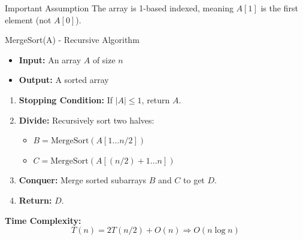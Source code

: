 \begin{frame}

\begin{alertblock}{Important Assumption}
        The array is 1-based indexed, meaning \( A[1] \) is the first element (not \( A[0] \)).
    \end{alertblock}
\begin{block}{MergeSort(A) - Recursive Algorithm}
        \begin{itemize}
            \item \textbf{Input:} An array \( A \) of size \( n \)
            \item \textbf{Output:} A sorted array
        \end{itemize}
        
        \begin{enumerate}
            \item \textbf{Stopping Condition:} If \( |A| \leq 1 \), return \( A \).
            \item \textbf{Divide:} Recursively sort two halves:
            \begin{itemize}
                \item \( B = \text{MergeSort}(A[1 \dots n/2]) \)
                \item \( C = \text{MergeSort}(A[(n/2)+1 \dots n]) \)
            \end{itemize}
            \item \textbf{Conquer:} Merge sorted subarrays \( B \) and \( C \) to get \( D \).
            \item \textbf{Return:} \( D \).
        \end{enumerate}
    \end{block}
\end{frame}


\begin{frame}
  \textbf{Time Complexity:}  
    \[
    T(n) = 2T(n/2) + O(n) \Rightarrow O(n \log n)
    \]
\end{frame}

